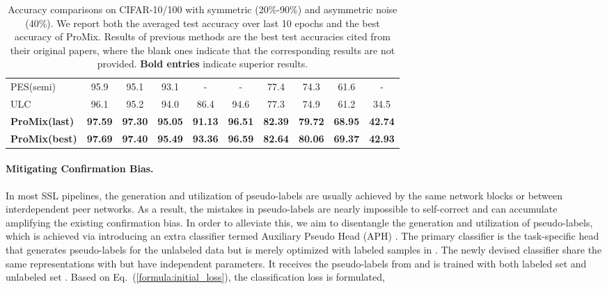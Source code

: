 \documentclass{article}
\begin{document}
\begin{table*}[!t]
\begin{tabular}{l || cccc | c||cccc}
			{PES(semi)}	&95.9&95.1	&93.1& - & -  &77.4 &74.3 &61.6  & -  \\	 
             

          						 	

            {ULC}	&96.1&95.2	&94.0&86.4&94.6 &77.3  &74.9&61.2  &34.5 \\	             						 	
			\midrule
			

			
			\textbf{ProMix(last)}	 &\textbf{97.59}	&\textbf{97.30}&\textbf{95.05}&\textbf{91.13} &\textbf{96.51}&\textbf{82.39}  &\textbf{79.72}&\textbf{68.95}  &\textbf{42.74} \\	
   \textbf{ProMix(best)}	 &\textbf{97.69}	&\textbf{97.40}&\textbf{95.49}&\textbf{93.36} &\textbf{96.59}&\textbf{82.64}  &\textbf{80.06}&\textbf{69.37}  &\textbf{42.93} \\	
		\bottomrule
    \end{tabular}
	\caption{Accuracy comparisons on CIFAR-10/100 with symmetric (20\%-90\%) and asymmetric noise (40\%). We report both the averaged test accuracy over last 10 epochs and the best accuracy of ProMix. Results of previous methods are the best test accuracies cited from their original papers, where the blank ones indicate that the corresponding results are not provided. \textbf{Bold entries} indicate superior results.}
	\label{tab:cifar}
\end{table*}			

\paragraph{Mitigating Confirmation Bias. }

In most SSL pipelines, the generation and utilization of pseudo-labels are usually achieved by the same network blocks or between interdependent peer networks. 
As a result, the mistakes in pseudo-labels are nearly impossible to self-correct and can accumulate amplifying the existing confirmation bias. In order to alleviate this, we aim to disentangle the generation and utilization of pseudo-labels, which is achieved via introducing an extra classifier termed Auxiliary Pseudo Head (APH) . The primary classifier  is the task-specific head that generates pseudo-labels for the unlabeled data but is merely optimized with labeled samples in . The newly devised classifier  share the same representations with  but have independent parameters. It receives the pseudo-labels from  and is trained with both labeled set  and unlabeled set . Based on Eq.~(\ref{formula:initial_loss}), the classification loss is formulated,
\end{document}

